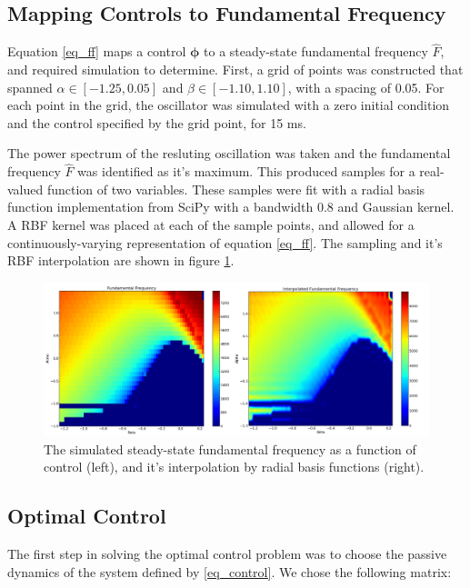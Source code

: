 \documentclass{article} %
\begin{document}
\subsection{Mapping Controls to Fundamental Frequency}

Equation \eqref{eq_ff} maps a control $\bm{\phi}$ to a steady-state fundamental frequency
$\hat{F}$, and required simulation to determine. First, a grid of points was constructed that spanned
$\alpha \in [-1.25, 0.05]$ and $\beta \in [-1.10, 1.10]$, with a spacing of 0.05. For each
point in the grid, the oscillator was simulated with a zero initial condition and the control
specified by the grid point, for 15 ms.

The power spectrum of the resluting oscillation was
taken and the fundamental frequency $\hat{F}$ was identified as it's maximum. This
produced samples for a real-valued function of two variables. These samples were fit with
a radial basis function implementation from SciPy with a bandwidth 0.8 and Gaussian kernel.
A RBF kernel was placed at each of the sample points, and allowed for a continuously-varying
representation of equation \eqref{eq_ff}. The sampling and it's RBF interpolation are shown
in figure \ref{fig:ff}.

\begin{figure}[h]
\centering
\includegraphics[width=1.0\textwidth]{images/ff_both.png}
\caption{The simulated steady-state fundamental frequency as a function of control (left), and it's interpolation by radial basis functions (right).}
\label{fig:ff}
\end{figure}

\subsection{Optimal Control}

The first step in solving the optimal control problem was to choose the passive dynamics
of the system defined by \eqref{eq_control}. We chose the following matrix:
\end{document}
